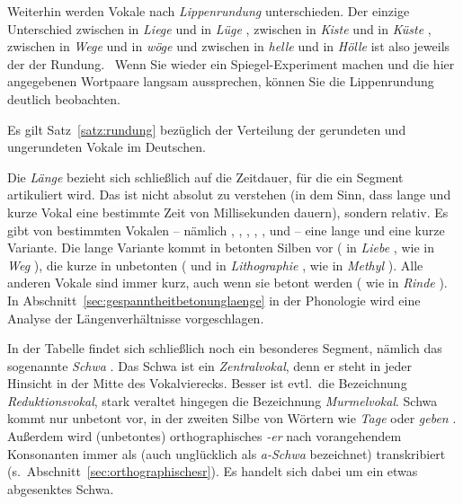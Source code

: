Weiterhin werden Vokale nach \textit{Lippenrundung} unterschieden.
Der einzige Unterschied
zwischen \textipa{[i]} in \textit{Liege} \textipa{[li:g@]} und \textipa{[y]} in \textit{Lüge} \textipa{[ly:g@]},
zwischen \textipa{[I]} in \textit{Kiste} \textipa{[kIst@]} und \textipa{[Y]} in \textit{Küste} \textipa{[kYst@]},
zwischen \textipa{[e]} in \textit{Wege} \textipa{[ve:g@]} und \textipa{[\o]} in \textit{wöge} \textipa{[v\o:g@]}
und zwischen \textipa{[E]} in \textit{helle} \textipa{[hEl@]} und \textipa{[\oe]} in \textit{Hölle} \textipa{[h{\oe}l@]}
ist also jeweils der der Rundung.
\TuBegin~Wenn Sie wieder ein Spiegel-Experiment machen und die hier angegebenen Wortpaare langsam aussprechen, können Sie die Lippenrundung deutlich beobachten.

Es gilt Satz~\ref{satz:rundung} bezüglich der Verteilung der gerundeten und ungerundeten Vokale im Deutschen.


Die \textit{Länge} bezieht sich schließlich auf die Zeitdauer, für die ein Segment artikuliert wird.
Das ist nicht absolut zu verstehen (in dem Sinn, dass lange und kurze Vokal eine bestimmte Zeit von Millisekunden dauern), sondern relativ.
Es gibt von bestimmten Vokalen -- nämlich \textipa{[i]}, \textipa{[y]}, \textipa{[u]}, \textipa{[e]}, \textipa{[\o]}, \textipa{[o]} und \textipa{[a]} -- eine lange und eine kurze Variante.
Die lange Variante kommt in betonten Silben vor (\textipa{[i:]} in \textit{Liebe} \textipa{[li:b@]}, \textipa{[e:]} wie in \textit{Weg} \textipa{[ve:k]}), die kurze in unbetonten (\textipa{[i]} und \textipa{[o]} in \textit{Lithographie} \textipa{[litogKafi:]}, \textipa{[e]} wie in \textit{Methyl} \textipa{[mety:l]}).
Alle anderen Vokale sind immer kurz, auch wenn sie betont werden (\textipa{[I]} wie in \textit{Rinde} \textipa{[KInd@]}).
In Abschnitt~\ref{sec:gespanntheitbetonunglaenge} in der Phonologie wird eine Analyse der Längenverhältnisse vorgeschlagen.

In der Tabelle findet sich schließlich noch ein besonderes Segment, nämlich das sogenannte \textit{Schwa} \textipa{[@]}.
Das Schwa ist ein \textit{Zentralvokal}, denn er steht in jeder Hinsicht in der Mitte des Vokalvierecks.
Besser ist evtl.\ die Bezeichnung \textit{Reduktionsvokal}, stark veraltet hingegen die Bezeichnung \textit{Murmelvokal}.
Schwa kommt nur unbetont vor, \zB in der zweiten Silbe von Wörtern wie \textit{Tage} \textipa{[ta:g@]} oder \textit{geben} \textipa{[ge:b@n]}.
Außerdem wird (unbetontes) orthographisches \textit{-er} nach vorangehendem Konsonanten immer als \textipa{[5]} (auch unglücklich als \textit{a-Schwa} bezeichnet) transkribiert (s.\ Abschnitt~\ref{sec:orthographischesr}).
Es handelt sich dabei um ein etwas abgesenktes Schwa.

